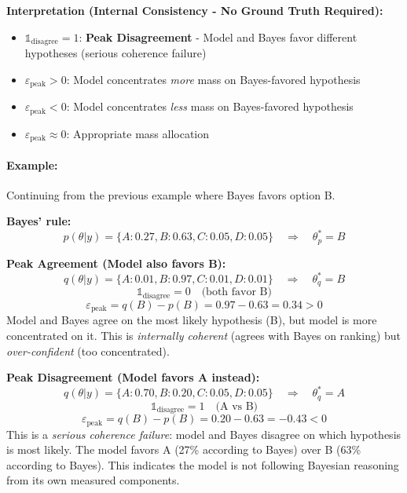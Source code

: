 \documentclass{article}
\theoremstyle{definition}
\begin{document}
\textbf{Interpretation (Internal Consistency - No Ground Truth Required):}
\begin{itemize}
    \item $\mathbb{1}_{\text{disagree}} = 1$: \textbf{Peak Disagreement} - Model and Bayes favor different hypotheses (serious coherence failure)
    \item $\varepsilon_{\text{peak}} > 0$: Model concentrates \emph{more} mass on Bayes-favored hypothesis
    \item $\varepsilon_{\text{peak}} < 0$: Model concentrates \emph{less} mass on Bayes-favored hypothesis
    \item $\varepsilon_{\text{peak}} \approx 0$: Appropriate mass allocation
\end{itemize}

\paragraph{Example:} Continuing from the previous example where Bayes favors option B.

\textbf{Bayes' rule:}
\begin{equation*}
p(\theta|y) = \{A: 0.27, B: 0.63, C: 0.05, D: 0.05\} \quad \Rightarrow \quad \theta_p^* = B
\end{equation*}

\textbf{Peak Agreement (Model also favors B):}
\begin{equation*}
q(\theta|y) = \{A: 0.01, B: 0.97, C: 0.01, D: 0.01\} \quad \Rightarrow \quad \theta_q^* = B
\end{equation*}
\begin{equation*}
\mathbb{1}_{\text{disagree}} = 0 \quad \text{(both favor B)}
\end{equation*}
\begin{equation*}
\varepsilon_{\text{peak}} = q(B) - p(B) = 0.97 - 0.63 = 0.34 > 0
\end{equation*}
Model and Bayes agree on the most likely hypothesis (B), but model is more concentrated on it. This is \emph{internally coherent} (agrees with Bayes on ranking) but \emph{over-confident} (too concentrated).

\textbf{Peak Disagreement (Model favors A instead):}
\begin{equation*}
q(\theta|y) = \{A: 0.70, B: 0.20, C: 0.05, D: 0.05\} \quad \Rightarrow \quad \theta_q^* = A
\end{equation*}
\begin{equation*}
\mathbb{1}_{\text{disagree}} = 1 \quad \text{(A vs B)}
\end{equation*}
\begin{equation*}
\varepsilon_{\text{peak}} = q(B) - p(B) = 0.20 - 0.63 = -0.43 < 0
\end{equation*}
This is a \emph{serious coherence failure}: model and Bayes disagree on which hypothesis is most likely. The model favors A (27\% according to Bayes) over B (63\% according to Bayes). This indicates the model is not following Bayesian reasoning from its own measured components.
\end{document}
